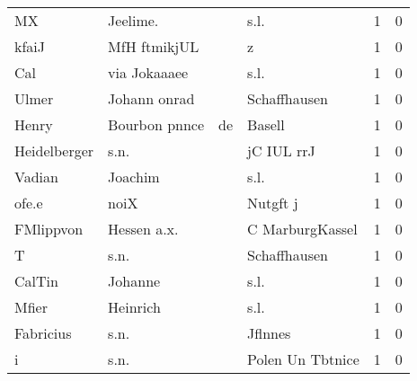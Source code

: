 \documentclass[10pt,a4paper,landscape]{article}
\begin{document}
\begin{longtable}{llllrr}
                       MX &                           Jeelime. &             &                                        s.l. &          1 &         0 \\
                    kfaiJ &                       MfH ftmikjUL &             &                                           z &          1 &         0 \\
                      Cal &                       via Jokaaaee &             &                                        s.l. &          1 &         0 \\
                    Ulmer &                       Johann onrad &             &                                Schaffhausen &          1 &         0 \\
                    Henry &                      Bourbon pnnce &          de &                                      Basell &          1 &         0 \\
             Heidelberger &                               s.n. &             &                                  jC IUL rrJ &          1 &         0 \\
                   Vadian &                            Joachim &             &                                        s.l. &          1 &         0 \\
                    ofe.e &                               noiX &             &                                    Nutgft j &          1 &         0 \\
                FMlippvon &                        Hessen a.x. &             &                             C MarburgKassel &          1 &         0 \\
                        T &                               s.n. &             &                                Schaffhausen &          1 &         0 \\
                   CalTin &                            Johanne &             &                                        s.l. &          1 &         0 \\
                    Mfier &                           Heinrich &             &                                        s.l. &          1 &         0 \\
                Fabricius &                               s.n. &             &                                     Jflnnes &          1 &         0 \\
                        i &                               s.n. &             &                            Polen Un Tbtnice &          1 &         0 \\

\end{longtable}
\end{document}
